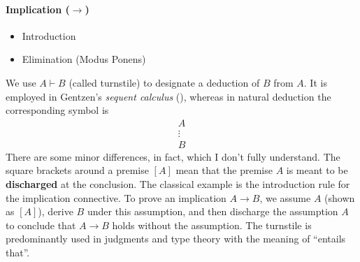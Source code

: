 \paragraph{Implication ($\to$)}
\begin{itemize}
    \item Introduction
    \begin{prooftree}
    \end{prooftree}
    \item Elimination (Modus Ponens)
    \begin{prooftree}
    \end{prooftree}
\end{itemize}

\begin{notation}
We use $A \vdash B$ (called turnstile) to designate a deduction of $B$ from $A$. 
It is employed in Gentzen’s \emph{sequent calculus} (\cite{girard1989proofs}), 
whereas in natural deduction the corresponding symbol is\[
\begin{array}{c}
A \\
\vdots \\
B
\end{array}
\]
There are some minor differences, in fact, which I don't fully understand.
The square brackets around a premise $[A]$ mean that the premise $A$ is meant to 
be \textbf{discharged} at the conclusion. The classical example is the 
introduction rule for the implication connective.
To prove an implication $A \to B$, we assume $A$ 
(shown as $[A]$), derive $B$ under this assumption, and then discharge the 
assumption $A$ to conclude that $A \to B$ holds without the assumption. 
The turnstile is predominantly used in judgments and type theory with 
the meaning of ``entails that''. 
\end{notation}

